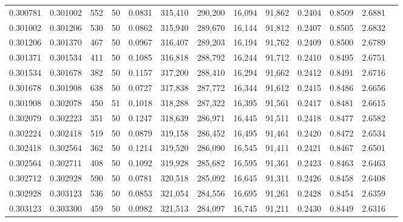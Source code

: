 \begin{tabular}{rrrrrrrrrrrrr}
0.300781 & 0.301002 &   552 &  50 &                                     0.0831 & 315,410 & 290,200 &  16,094 &  91,862 & 0.2404 & 0.8509 & 2.6881 \\
0.301002 & 0.301206 &   530 &  50 &                                     0.0862 & 315,940 & 289,670 &  16,144 &  91,812 & 0.2407 & 0.8505 & 2.6832 \\
0.301206 & 0.301370 &   467 &  50 &                                     0.0967 & 316,407 & 289,203 &  16,194 &  91,762 & 0.2409 & 0.8500 & 2.6789 \\
0.301371 & 0.301534 &   411 &  50 &                                     0.1085 & 316,818 & 288,792 &  16,244 &  91,712 & 0.2410 & 0.8495 & 2.6751 \\
0.301534 & 0.301678 &   382 &  50 &                                     0.1157 & 317,200 & 288,410 &  16,294 &  91,662 & 0.2412 & 0.8491 & 2.6716 \\
0.301678 & 0.301908 &   638 &  50 &                                     0.0727 & 317,838 & 287,772 &  16,344 &  91,612 & 0.2415 & 0.8486 & 2.6656 \\
0.301908 & 0.302078 &   450 &  51 &                                     0.1018 & 318,288 & 287,322 &  16,395 &  91,561 & 0.2417 & 0.8481 & 2.6615 \\
0.302079 & 0.302223 &   351 &  50 &                                     0.1247 & 318,639 & 286,971 &  16,445 &  91,511 & 0.2418 & 0.8477 & 2.6582 \\
0.302224 & 0.302418 &   519 &  50 &                                     0.0879 & 319,158 & 286,452 &  16,495 &  91,461 & 0.2420 & 0.8472 & 2.6534 \\
0.302418 & 0.302564 &   362 &  50 &                                     0.1214 & 319,520 & 286,090 &  16,545 &  91,411 & 0.2421 & 0.8467 & 2.6501 \\
0.302564 & 0.302711 &   408 &  50 &                                     0.1092 & 319,928 & 285,682 &  16,595 &  91,361 & 0.2423 & 0.8463 & 2.6463 \\
0.302712 & 0.302928 &   590 &  50 &                                     0.0781 & 320,518 & 285,092 &  16,645 &  91,311 & 0.2426 & 0.8458 & 2.6408 \\
0.302928 & 0.303123 &   536 &  50 &                                     0.0853 & 321,054 & 284,556 &  16,695 &  91,261 & 0.2428 & 0.8454 & 2.6359 \\
0.303123 & 0.303300 &   459 &  50 &                                     0.0982 & 321,513 & 284,097 &  16,745 &  91,211 & 0.2430 & 0.8449 & 2.6316 \\

\end{tabular}
